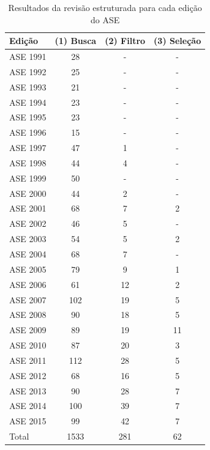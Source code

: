 \begin{table}[h]
\caption{Resultados da revisão estruturada para cada edição do ASE}
\centering
\begin{tabular}{| l | c | c | c |}
\hline
Edição & (1) Busca & (2) Filtro & (3) Seleção \\
\hline
ASE 1991 & 28    & -         & -           \\
ASE 1992 & 25    & -         & -           \\
ASE 1993 & 21    & -         & -           \\
ASE 1994 & 23    & -         & -           \\
ASE 1995 & 23    & -         & -           \\
ASE 1996 & 15    & -         & -           \\
ASE 1997 & 47    & 1         & -           \\
ASE 1998 & 44    & 4         & -           \\
ASE 1999 & 50    & -         & -           \\
ASE 2000 & 44    & 2         & -           \\
ASE 2001 & 68    & 7         & 2           \\
ASE 2002 & 46    & 5         & -           \\
ASE 2003 & 54    & 5         & 2           \\
ASE 2004 & 68    & 7         & -           \\
ASE 2005 & 79    & 9         & 1           \\
ASE 2006 & 61    & 12        & 2           \\
ASE 2007 & 102   & 19        & 5           \\
ASE 2008 & 90    & 18        & 5           \\
ASE 2009 & 89    & 19        & 11          \\
ASE 2010 & 87    & 20        & 3           \\
ASE 2011 & 112   & 28        & 5           \\
ASE 2012 & 68    & 16        & 5           \\
ASE 2013 & 90    & 28        & 7           \\
ASE 2014 & 100   & 39        & 7           \\
ASE 2015 & 99    & 42        & 7           \\
\hline
Total    & 1533  & 281       & 62          \\
\hline
\end{tabular}
\label{artigos-do-ase}
\end{table}

